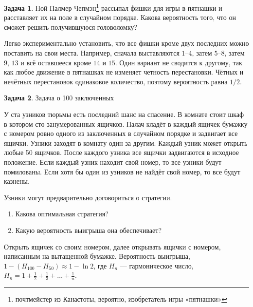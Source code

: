 \documentclass[nobib]{tufte-handout}
\theoremstyle{definition}
\newtheorem{problem}{Задача}
\begin{document}
\begin{problem}
Ной Палмер Чепмэн\footnote{почтмейстер из Канастоты, вероятно, изобретатель игры «пятнашки»} рассыпал фишки для игры в пятнашки и расставляет их на поле в случайном порядке. Какова вероятность того, что он сможет решить получившуюся головоломку?

\begin{sol}
Легко экспериментально установить, что все фишки кроме двух последних можно поставить на свои места. Например, сначала выставляются $1$--$4$, затем $5$--$8$, затем $9$, $13$ и всё оставшееся кроме $14$ и $15$.  Один вариант не сводится к другому, так как любое движение в пятнашках не изменяет четность перестановки. Чётных и нечётных перестановок одинаковое количество, поэтому вероятность равна $1/2$.
\end{sol}

\end{problem}


\begin{problem}
Задача о 100 заключенных

У ста узников тюрьмы есть последний шанс на спасение. В комнате стоит шкаф в котором сто занумерованных ящичков. Палач кладёт в каждый ящичек бумажку с номером ровно одного из заключенных в случайном порядке и задвигает все ящички. Узники заходят в комнату один за другим. Каждый узник может открыть любые 50 ящичков. После каждого узника все ящички задвигаются в исходное положение. Если каждый узник находит свой номер, то все узники будут помилованы. Если хотя бы один из узников не найдёт свой номер, то все будут казнены.

Узники могут предварительно договориться о стратегии.

\begin{enumerate}
\item Какова оптимальная стратегия?
\item Какую вероятность выигрыша она обеспечивает?
\end{enumerate}

\begin{sol}
Открыть ящичек со своим номером, далее открывать ящички с номером, написанным на вытащенной бумажке. Вероятность выигрыша, $1-(H_{100}-H_{50}) \approx 1- \ln 2$, где $H_n$ — гармоническое число, $H_n=1+\frac{1}{2} + \frac{1}{3} + \ldots + \frac{1}{n}$.
\end{sol}

\end{problem}
\end{document}
